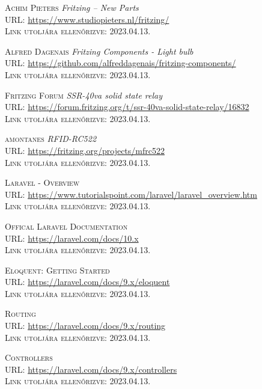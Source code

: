\documentclass[
]{thesis-ekf}
\theoremstyle{definition}
\theoremstyle{remark}
\begin{document}
\begin{thebibliography}{46}
		\textsc{Achim Pieters} \emph{Fritzing – New Parts}\\
		\textsc{URL:} \url{https://www.studiopieters.nl/fritzing/}\\
		\textsc{Link utoljára ellenőrizve:} 2023.04.13.
		
		\textsc{Alfred Dagenais} \emph{Fritzing Components - Light bulb}\\
		\textsc{URL:} \url{https://github.com/alfreddagenais/fritzing-components/}\\
		\textsc{Link utoljára ellenőrizve:} 2023.04.13.
		
		\textsc{Fritzing Forum} \emph{SSR-40va solid state relay}\\
		\textsc{URL:} \url{https://forum.fritzing.org/t/ssr-40va-solid-state-relay/16832}\\
		\textsc{Link utoljára ellenőrizve:} 2023.04.13.
		
		\textsc{amontanes} \emph{RFID-RC522}\\
		\textsc{URL:} \url{https://fritzing.org/projects/mfrc522}\\
		\textsc{Link utoljára ellenőrizve:} 2023.04.13.
		
		\textsc{Laravel - Overview}\\
		\textsc{URL:} \url{https://www.tutorialspoint.com/laravel/laravel_overview.htm}\\
		\textsc{Link utoljára ellenőrizve:} 2023.04.13.
		
		\textsc{Offical Laravel Documentation}\\
		\textsc{URL:} \url{https://laravel.com/docs/10.x}\\
		\textsc{Link utoljára ellenőrizve:} 2023.04.13.
		
		\textsc{Eloquent: Getting Started}\\
		\textsc{URL:} \url{https://laravel.com/docs/9.x/eloquent}\\
		\textsc{Link utoljára ellenőrizve:} 2023.04.13.
		
		\textsc{Routing}\\
		\textsc{URL:} \url{https://laravel.com/docs/9.x/routing}\\
		\textsc{Link utoljára ellenőrizve:} 2023.04.13.
		
		\textsc{Controllers}\\
		\textsc{URL:} \url{https://laravel.com/docs/9.x/controllers}\\
		\textsc{Link utoljára ellenőrizve:} 2023.04.13.
		

\end{thebibliography}
\end{document}

